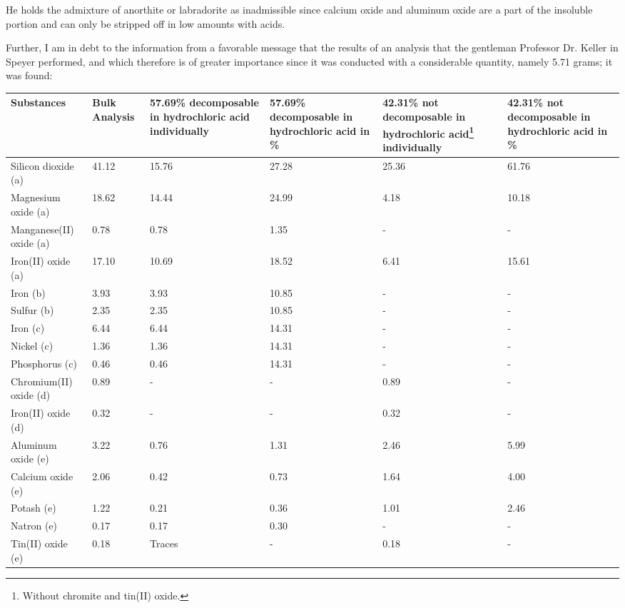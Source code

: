\documentclass[a4paper, 12pt, oneside]{article}
\begin{document}
He holds the admixture of anorthite or labradorite as inadmissible since calcium oxide and aluminum oxide are a part of the insoluble portion and can only be stripped off in low amounts with acids.

Further, I am in debt to the information from a favorable message that the results of an analysis that the gentleman Professor Dr. Keller in Speyer performed, and which therefore is of greater importance since it was conducted with a considerable quantity, namely 5.71 grams; it was found:
\begin{center}
\footnotesize
    \begin{tabular}{ |l|p{1.3cm}|p{1.7cm}|p{1.7cm}|p{1.7cm}|p{1.7cm}| }
        \hline
        Substances & \small{Bulk Analysis} & \small{57.69\% decomposable in hydrochloric acid individually} & \small{57.69\% decomposable in hydrochloric acid in \%} & \small{42.31\% not decomposable in hydrochloric acid\footnote{Without chromite and tin(II) oxide.} individually} & \small{42.31\% not decomposable in hydrochloric acid in \%}\\\hline
        Silicon dioxide (a) & 41.12 & 15.76 & 27.28 & 25.36 & 61.76\\\hline
        Magnesium oxide (a) & 18.62 & 14.44 & 24.99 & 4.18 & 10.18\\\hline
        Manganese(II) oxide (a) & 0.78 & 0.78 & 1.35 & - & -\\\hline
        Iron(II) oxide (a) & 17.10 & 10.69 & 18.52 & 6.41 & 15.61\\\hline
        Iron (b) & 3.93 & 3.93 & 10.85 & - & -\\\hline
        Sulfur (b) & 2.35 & 2.35 & 10.85 & - & -\\\hline
        Iron (c) & 6.44 & 6.44 & 14.31 & - & -\\\hline
        Nickel (c) & 1.36 & 1.36 & 14.31 & - & -\\\hline
        Phosphorus (c) & 0.46 & 0.46 & 14.31 & - & -\\\hline
        Chromium(II) oxide (d) & 0.89 & - & - & 0.89 & -\\\hline
        Iron(II) oxide (d) & 0.32 & - & - & 0.32 & -\\\hline
        Aluminum oxide (e) & 3.22 & 0.76 & 1.31 & 2.46 & 5.99\\\hline
        Calcium oxide (e) & 2.06 & 0.42 & 0.73 & 1.64 & 4.00\\\hline
        Potash (e) & 1.22 & 0.21 & 0.36 & 1.01 & 2.46\\\hline
        Natron (e) & 0.17 & 0.17 & 0.30 & - & -\\\hline
        Tin(II) oxide (e) & 0.18 & Traces & - & 0.18 & -\\
        \hline
    \end{tabular}
\end{center}
\end{document}
